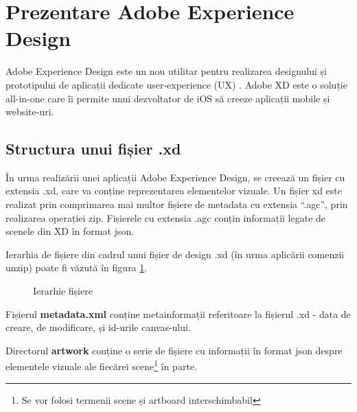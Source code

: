 \section{Prezentare Adobe Experience Design}

Adobe Experience Design este un nou utilitar pentru realizarea designului și prototipului de aplicații dedicate user-experience (UX) \cite{xd}. Adobe XD este o soluție all-in-one care îi permite unui dezvoltator de iOS să creeze aplicații mobile și website-uri. 

\subsection{Structura unui fișier .xd}

În urma realizării unei aplicații Adobe Experience Design, se creează un fișier cu extensia .xd, care va conține reprezentarea elementelor vizuale. 
Un fișier xd este realizat prin comprimarea mai multor fișiere de metadata cu extensia “.agc”, prin realizarea operației zip. Fișierele cu extensia .agc conțin informații legate de scenele din XD în format json.

Ierarhia de fișiere din cadrul unui fișier de design .xd (în urma aplicării comenzii unzip) poate fi văzută în figura \ref{fig:ierarhie}.

\begin{figure}[!htbp]
\caption{Ierarhie fișiere} \label{fig:ierarhie}
\end{figure}

Fișierul \textbf{metadata.xml} conține metainformații referitoare la fișierul .xd - data de creare, de modificare, și id-urile canvas-ului.

Directorul \textbf{artwork} conține o serie de fișiere cu informații în format json despre elementele vizuale ale fiecărei scene\footnote{Se vor folosi termenii scene și artboard interschimbabil} în parte. 

